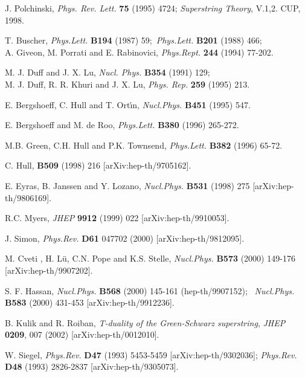 \documentclass[a4paper,11pt]{article}
\begin{document}
\begin{thebibliography}{99}

J. Polchinski, {\em Phys. Rev. Lett.} {\bf 75} (1995) 4724; 
{\sl Superstring Theory}, V.1,2. CUP, 1998.   



T. Buscher, 
{\em Phys.Lett.} {\bf B194} (1987) 59;\,  
{\em Phys.Lett.} {\bf B201} (1988) 466; 
\\ A. Giveon, M. Porrati and E. Rabinovici,
 {\em Phys.Rept.} {\bf 244} (1994) 77-202. 

M. J. Duff and J. X. Lu, 
{\em
Nucl. Phys.} {\bf B354} (1991) 129; 
\\ M. J. Duff, R. R. Khuri and J. X. Lu, 
{\em Phys. Rep.} {\bf 259} (1995) 213.


E. Bergshoeff, C. Hull and T. Ort\'{\i}n, 
{\em Nucl.Phys.} {\bf B451} (1995) 547.



E. Bergshoeff and M. de Roo, 
{\em Phys.Lett.} {\bf B380} (1996) 265-272. 

M.B. Green, C.H. Hull and P.K. Townsend, 
{\em Phys.Lett.} {\bf B382} (1996) 65-72.

C. Hull, 
{\bf B509} (1998) 216 [arXiv:hep-th/9705162].


E. Eyras, B. Janssen and Y. Lozano, 
{\em Nucl.Phys.} {\bf B531} (1998) 275 
[arXiv:hep-th/9806169].

R.C. Myers, 
{\em JHEP} {\bf 9912} (1999) 022 
[arXiv:hep-th/9910053]. 


J. Simon, 
{\em Phys.Rev.} {\bf D61} 047702 (2000) [arXiv:hep-th/9812095].


M. Cveti\coordHE{} , H. L\"{u}, C.N. Pope and K.S. Stelle,
{\em Nucl.Phys.} {\bf B573} (2000) 149-176
[arXiv:hep-th/9907202].

S. F. Hassan, 
{\em Nucl.Phys.} {\bf B568} (2000) 145-161 (hep-th/9907152); \, 
{\em Nucl.Phys.} {\bf B583} (2000) 431-453 
[arXiv:hep-th/9912236]. 

 B.  Kulik and R. Roiban, 
{\sl T-duality of the Green-Schwarz superstring}, 
{\em JHEP} {\bf 0209}, 007 (2002) [arXiv:hep-th/0012010].

 W. Siegel, 
{\em Phys.Rev.} {\bf D47} (1993) 5453-5459 [arXiv:hep-th/9302036]; 
 {\em Phys.Rev.} {\bf D48} (1993) 2826-2837 [arXiv:hep-th/9305073]. 


\end{thebibliography}
\end{document}
